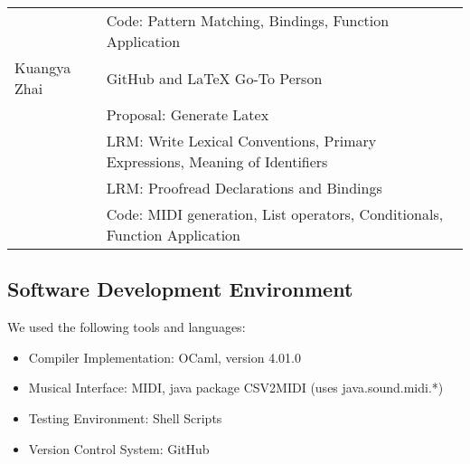 \begin{table}[htdp]
\begin{tabular}{|l|l|}
										& Code: Pattern Matching, Bindings, Function Application \\
		Kuangya Zhai & GitHub and LaTeX Go-To Person \\ 
								& Proposal: Generate Latex \\
								& LRM: Write Lexical Conventions, Primary Expressions, Meaning of Identifiers \\
								& LRM:  Proofread Declarations and Bindings \\
								& Code: MIDI generation, List operators, Conditionals, Function Application \\
		\hline
		\end{tabular}
		\end{table} 
		
	\subsection{Software Development Environment}
		We used the following tools and languages:
		\begin{itemize}
		\item Compiler Implementation: OCaml, version 4.01.0
		\item Musical Interface: MIDI, java package CSV2MIDI (uses java.sound.midi.*) ~\cite{csv2midi} 
		\item Testing Environment: Shell Scripts
		\item Version Control System: GitHub
		\end{itemize}
	
